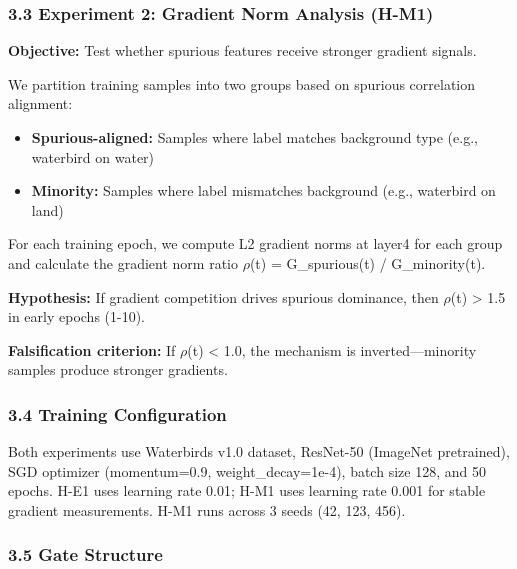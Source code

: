 \subsubsection{3.3 Experiment 2: Gradient Norm Analysis (H-M1)}

\textbf{Objective:} Test whether spurious features receive stronger gradient signals.

We partition training samples into two groups based on spurious correlation alignment:
\begin{itemize}
\item \textbf{Spurious-aligned:} Samples where label matches background type (e.g., waterbird on water)
\item \textbf{Minority:} Samples where label mismatches background (e.g., waterbird on land)
\end{itemize}

For each training epoch, we compute L2 gradient norms at layer4 for each group and calculate the gradient norm ratio $\rho$(t) = G\_spurious(t) / G\_minority(t).

\textbf{Hypothesis:} If gradient competition drives spurious dominance, then $\rho$(t) > 1.5 in early epochs (1-10).

\textbf{Falsification criterion:} If $\rho$(t) < 1.0, the mechanism is inverted---minority samples produce stronger gradients.

\subsubsection{3.4 Training Configuration}

Both experiments use Waterbirds v1.0 dataset, ResNet-50 (ImageNet pretrained), SGD optimizer (momentum=0.9, weight\_decay=1e-4), batch size 128, and 50 epochs. H-E1 uses learning rate 0.01; H-M1 uses learning rate 0.001 for stable gradient measurements. H-M1 runs across 3 seeds (42, 123, 456).

\subsubsection{3.5 Gate Structure}

\begin{table}[htbp]
\centering
{}
\end{table}
